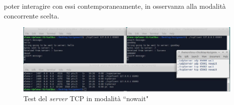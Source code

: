 \documentclass[a4paper, 12pt]{report}
\begin{document}
\begin{enumerate}
\begin{itemize}
		poter interagire con essi contemporaneamente, in osservanza alla modalità concorrente scelta.
		\begin{figure}[H]
			\centering
			\includegraphics[width=\linewidth]{images/launch_tcpClientNowait.JPG}
			\caption{Test del \textit{server} TCP in modalità ``nowait"}
		\end{figure}
	\end{itemize}
\end{enumerate}
\end{document}
